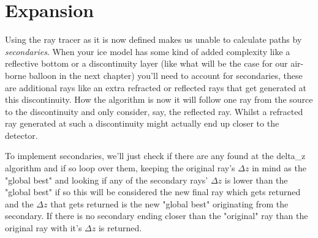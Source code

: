 \section{Expansion}
Using the ray tracer as it is now defined makes us unable to calculate paths by
\textit{secondaries}.  When your ice model has some kind of added complexity
like a reflective bottom or a discontinuity layer (like what will be the case
for our air-borne balloon in the next chapter) you'll need to account for
secondaries, these are additional rays like an extra refracted or reflected
rays that get generated at this discontinuity. How the algorithm is now it will
follow one ray from the source to the discontinuity and only consider, say, the
reflected ray. Whilst a refracted ray generated at such a discontinuity might
actually end up closer to the detector.

To implement secondaries, we'll just check if there are any found at the
delta\_z algorithm and if so loop over them, keeping the original ray's $\Delta
z$ in mind as the "global best" and looking if any of the secondary rays'
$\Delta z$ is lower than the "global best" if so this will be considered the
new final ray which gets returned and the $\Delta z$ that gets returned is the
new "global best" originating from the secondary. If there is no secondary
ending closer than the "original" ray than the original ray with it's $\Delta
z$ is returned.


